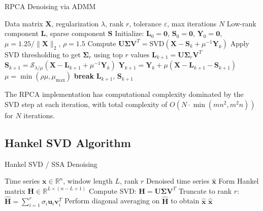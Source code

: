 \documentclass[10pt,twocolumn]{article}
\begin{document}
\begin{algorithm}
\caption{RPCA Denoising via ADMM}
\begin{algorithmic}[1]
\REQUIRE Data matrix $\mathbf{X}$, regularization $\lambda$, rank $r$, tolerance $\varepsilon$, max iterations $N$
\ENSURE Low-rank component $\mathbf{L}$, sparse component $\mathbf{S}$
\STATE Initialize: $\mathbf{L}_0 = \mathbf{0}$, $\mathbf{S}_0 = \mathbf{0}$, $\mathbf{Y}_0 = \mathbf{0}$, $\mu = 1.25/\|\mathbf{X}\|_2$, $\rho = 1.5$
\STATE Compute $\mathbf{U}\mathbf{\Sigma}\mathbf{V}^T = \text{SVD}(\mathbf{X} - \mathbf{S}_k + \mu^{-1}\mathbf{Y}_k)$
\STATE Apply SVD thresholding to get $\mathbf{\Sigma}_r$ using top $r$ values
\STATE $\mathbf{L}_{k+1} = \mathbf{U}\mathbf{\Sigma}_r\mathbf{V}^T$
\STATE $\mathbf{S}_{k+1} = \mathcal{S}_{\lambda/\mu}(\mathbf{X} - \mathbf{L}_{k+1} + \mu^{-1}\mathbf{Y}_k)$
\STATE $\mathbf{Y}_{k+1} = \mathbf{Y}_k + \mu(\mathbf{X} - \mathbf{L}_{k+1} - \mathbf{S}_{k+1})$
\STATE $\mu = \min(\rho\mu, \mu_{\max})$
\STATE \textbf{break}
\ENDIF
\ENDFOR
\RETURN $\mathbf{L}_{k+1}$, $\mathbf{S}_{k+1}$
\end{algorithmic}
\end{algorithm}

The RPCA implementation has computational complexity dominated by the SVD step at each iteration, with total complexity of $O(N \cdot \min(mn^2, m^2n))$ for $N$ iterations.

\subsection{Hankel SVD Algorithm}

\begin{algorithm}
\caption{Hankel SVD / SSA Denoising}
\begin{algorithmic}[1]
\REQUIRE Time series $\mathbf{x} \in \mathbb{R}^n$, window length $L$, rank $r$
\ENSURE Denoised time series $\mathbf{\hat{x}}$
\STATE Form Hankel matrix $\mathbf{H} \in \mathbb{R}^{L \times (n-L+1)}$
\STATE Compute SVD: $\mathbf{H} = \mathbf{U} \mathbf{\Sigma} \mathbf{V}^T$
\STATE Truncate to rank $r$: $\mathbf{\hat{H}} = \sum_{i=1}^{r} \sigma_i \mathbf{u}_i \mathbf{v}_i^T$
\STATE Perform diagonal averaging on $\mathbf{\hat{H}}$ to obtain $\mathbf{\hat{x}}$
\RETURN $\mathbf{\hat{x}}$
\end{algorithmic}
\end{algorithm}
\end{document}

